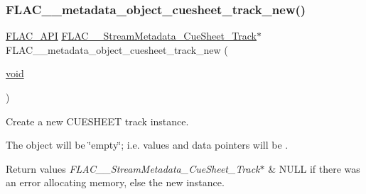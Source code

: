 \subsubsection{\texorpdfstring{F\+L\+A\+C\+\_\+\+\_\+metadata\+\_\+object\+\_\+cuesheet\+\_\+track\+\_\+new()}{FLAC\_\_metadata\_object\_cuesheet\_track\_new()}}
{\footnotesize\ttfamily \hyperlink{group__flac__export_ga56ca07df8a23310707732b1c0007d6f5}{F\+L\+A\+C\+\_\+\+A\+PI} \hyperlink{struct_f_l_a_c_____stream_metadata___cue_sheet___track}{F\+L\+A\+C\+\_\+\+\_\+\+Stream\+Metadata\+\_\+\+Cue\+Sheet\+\_\+\+Track}$\ast$ F\+L\+A\+C\+\_\+\+\_\+metadata\+\_\+object\+\_\+cuesheet\+\_\+track\+\_\+new (\begin{DoxyParamCaption}\item[{\hyperlink{png_8h_ac9c84fa68bbad002983e35ce3663c686}{void}}]{ }\end{DoxyParamCaption})}

Create a new C\+U\+E\+S\+H\+E\+ET track instance.

The object will be \char`\"{}empty\char`\"{}; i.\+e. values and data pointers will be {}.


\begin{DoxyRetVals}{Return values}
{\em F\+L\+A\+C\+\_\+\+\_\+\+Stream\+Metadata\+\_\+\+Cue\+Sheet\+\_\+\+Track$\ast$} & {\ttfamily N\+U\+LL} if there was an error allocating memory, else the new instance. \\
\hline
\end{DoxyRetVals}
\mbox{\label{group__flac__metadata__object_ga57dfba89ba704574bde4e3fcd925d473}} 
